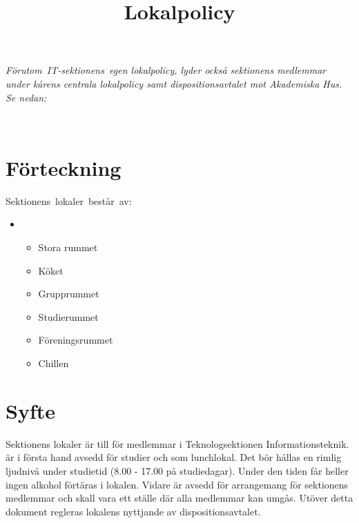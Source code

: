 \documentclass[11pt, includeaddress]{classes/cthit}
\begin{document}
\title{Lokalpolicy}
\maketitle

\thispagestyle{empty}

\newpage

\makeheadfoot%

\setcounter{tocdepth}{2}
\setcounter{page}{1}
\tableofcontents

\newpage

\emph{Förutom IT­-sektionens egen lokalpolicy, lyder också sektionens medlemmar under kårens centrala lokalpolicy samt dispositionsavtalet mot Akademiska Hus. Se nedan:}

\\


\section{Förteckning}
Sektionens lokaler består av:
\begin{itemize}  
  \item \HUBBEN 
  	\begin{itemize}  
	  \item Stora rummet
	  \item Köket
	  \item Grupprummet
	  \item Studierummet
	  \item Föreningsrummet
	  \item Chillen
	\end{itemize}
\end{itemize}


\section{Syfte}
Sektionens lokaler är till för medlemmar i Teknologsektionen Informationsteknik.
\HUBBEN är i första hand avsedd för studier och som lunchlokal. Det bör hållas en rimlig ljudnivå under studietid (8.00 - 17.00 på studiedagar). Under den tiden får heller ingen alkohol förtäras i lokalen. Vidare är \HUBBEN avsedd för arrangemang för sektionens medlemmar och skall vara ett ställe där alla medlemmar kan umgås. Utöver detta dokument regleras lokalens nyttjande av dispositionsavtalet.
\end{document}
